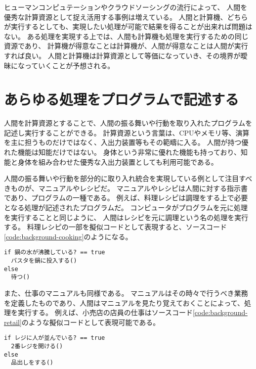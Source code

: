 ヒューマンコンピュテーションやクラウドソーシングの流行によって、
人間を優秀な計算資源として捉え活用する事例は増えている。
人間と計算機、どちらが実行するとしても、実現したい処理が可能で結果を得ることが出来れば問題はない。
ある処理を実現する上では、人間も計算機も処理を実行するための同じ資源であり、
計算機が得意なことは計算機が、人間が得意なことは人間が実行すれば良い。
人間と計算機は計算資源として等価になっていき、その境界が曖昧になっていくことが予想される。

\section{あらゆる処理をプログラムで記述する}\label{ux3042ux3089ux3086ux308bux51e6ux7406ux3092ux30d7ux30edux30b0ux30e9ux30e0ux3067ux8a18ux8ff0ux3059ux308b}

人間を計算資源とすることで、人間の振る舞いや行動を取り入れたプログラムを記述し実行することができる。
計算資源という言葉は、CPUやメモリ等、演算を主に担うものだけではなく、入出力装置等もその範疇に入る。
人間が持つ優れた機能は知能だけではない。
身体という非常に優れた機能も持っており、知能と身体を組み合わせた優秀な入出力装置としても利用可能である。

人間の振る舞いや行動を部分的に取り入れ統合を実現している例として注目すべきものが、マニュアルやレシピだ。
マニュアルやレシピは人間に対する指示書であり、プログラムの一種である。
例えば、料理レシピは調理をする上で必要となる処理が記述されたプログラムだ。
コンピュータがプログラムを元に処理を実行することと同じように、
人間はレシピを元に調理という名の処理を実行する。
料理レシピの一部を擬似コードとして表現すると、ソースコード\ref{code:background-cooking}のようになる。

\begin{lstlisting}[caption=料理レシピの一部を擬似コードで表す, label=code:background-cooking]
if 鍋の水が沸騰している? == true
  パスタを鍋に投入する()
else
  待つ()
\end{lstlisting}

また、仕事のマニュアルも同様である。
マニュアルはその時々で行うべき業務を定義したものであり、人間はマニュアルを見たり覚えておくことによって、処理を実行する。
例えば、小売店の店員の仕事はソースコード\ref{code:background-retail}のような擬似コードとして表現可能である。

\begin{lstlisting}[caption=小売店の店員の挙動の一部を擬似コードで表す, label=code:background-retail]
if レジに人が並んでいる? == true
  2番レジを開ける()
else
  品出しをする()
\end{lstlisting}


